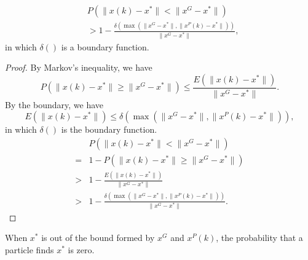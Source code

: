 \begin{mycoro}
\label{lem:mutimodal:particle:prob}
\begin{equation}
\begin{aligned}
& P( \lVert x(k) - x^{*} \rVert < \lVert x^{G} - x^{*} \rVert ) \\
& > 1 - \frac{ \delta ( \max ( \lVert x^{G} - x^{*} \rVert , \lVert x^{P}(k) - x^{*}  \rVert ) ) }{ \lVert x^{G} - x^{*} \rVert },
\end{aligned}
\end{equation}
in which $ \delta () $ is a boundary function.
\begin{proof}
By Markov's inequality, we have
\begin{equation}
P( \lVert x(k) - x^{*} \rVert \geq \lVert x^{G} - x^{*} \rVert ) \leq \frac{ E( \lVert x(k) - x^{*} \rVert ) }{ \lVert x^{G} - x^{*} \rVert }.
\end{equation} 
By the boundary, we have
\begin{equation}
E( \lVert x(k) - x^{*} \rVert ) \leq \delta ( \max ( \lVert x^{G} - x^{*} \rVert , \lVert x^{P}(k) - x^{*}  \rVert ) ),
\end{equation}
in which $ \delta () $ is the boundary function.
\begin{equation}
\begin{aligned}
& P( \lVert x(k) - x^{*} \rVert < \lVert x^{G} - x^{*} \rVert ) \\
= & 1 - P( \lVert x(k) - x^{*} \rVert \geq \lVert x^{G} - x^{*} \rVert ) \\
> & 1 - \frac{ E( \lVert x(k) - x^{*} \rVert ) }{ \lVert x^{G} - x^{*} \rVert } \\
> & 1 - \frac{ \delta ( \max ( \lVert x^{G} - x^{*} \rVert , \lVert x^{P}(k) - x^{*}  \rVert ) ) }{ \lVert x^{G} - x^{*} \rVert }.
\end{aligned}
\end{equation}
\end{proof}
\end{mycoro}

\begin{mythm}
\label{thm:multimodal:in_scope}
\end{mythm}

\begin{mythm}
\label{thm:multimodal:out_of_scope}
When $ x^{*} $ is out of the bound formed by $ x^{G} $ and $ x^{P}(k) $, the probability that a particle finds $ x^{*} $ is zero.
\end{mythm}



